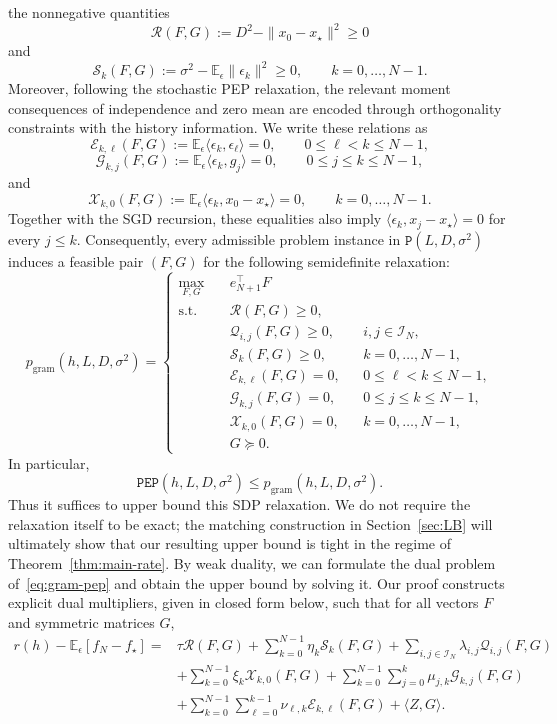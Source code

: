 \documentclass[11pt, hidelinks]{article}
\begin{document}
the nonnegative quantities \[ \mathcal R(F,G) := D^2- \|x_0-x_\star\|^2 \geq0 \] and \[ \mathcal S_k(F,G) := \sigma^2- \mathbb{E}_{\epsilon}\|\epsilon_k\|^2 \geq0, \qquad k=0,\ldots,N-1. \]
Moreover, following the stochastic PEP relaxation, the relevant moment consequences of independence and zero mean are encoded through orthogonality constraints with the history information. We write these relations as
\[ \mathcal E_{k,\ell}(F,G) :=\mathbb{E}_{\epsilon} \langle\epsilon_k,\epsilon_\ell\rangle =0, \qquad 0\leq\ell<k\leq N-1, \]
\[ \mathcal G_{k,j}(F,G) :=\mathbb{E}_{\epsilon} \langle\epsilon_k,g_j\rangle =0, \qquad 0\leq j\leq k\leq N-1, \]
and \[ \mathcal X_{k,0}(F,G) :=\mathbb{E}_{\epsilon} \langle\epsilon_k,x_0-x_\star\rangle =0, \qquad k=0,\ldots,N-1. \]
Together with the SGD recursion, these equalities also imply
$\langle\epsilon_k,x_j-x_\star\rangle=0$
for every $j\leq k$.
Consequently, every admissible problem instance in
$\mathtt P(L,D,\sigma^2)$ induces a feasible pair $(F,G)$ for the
following semidefinite relaxation:
\begin{equation}
\label{eq:gram-pep}
p_{\mathrm{gram}}(h,L,D,\sigma^2) =
\left\{ \begin{aligned}
\max_{F,G}\quad
    &e_{N+1}^\top F
\\
\mathrm{s.t.}\quad
    &\mathcal R(F,G)\geq0,
\\
    &\mathcal Q_{i,j}(F,G)\geq0,
        && i,j\in\mathcal I_N,
\\
    &\mathcal S_k(F,G)\geq0,
        && k=0,\ldots,N-1,
\\
    &\mathcal E_{k,\ell}(F,G)=0,
        &&0\leq\ell<k\leq N-1,
\\
    &\mathcal G_{k,j}(F,G)=0,
        &&0\leq j\leq k\leq N-1,
\\
    &\mathcal X_{k,0}(F,G)=0,
        &&k=0,\ldots,N-1,
\\
    &G\succeq0.
\end{aligned} \right.
\end{equation}
In particular, \[ \mathtt{PEP}(h,L,D,\sigma^2) \leq p_{\mathrm{gram}}(h,L,D,\sigma^2).\]
Thus it suffices to upper bound this SDP relaxation. We do not require
the relaxation itself to be exact; the matching construction in
Section~\ref{sec:LB} will ultimately show that our resulting upper bound
is tight in the regime of Theorem~\ref{thm:main-rate}.
By weak duality, we can formulate the dual problem of~\eqref{eq:gram-pep} and obtain the upper bound by solving it.
Our proof constructs explicit dual multipliers, given in closed form below, such that for all vectors $F$ and symmetric matrices $G$, \begin{equation}\label{eq:certificate-identity}
\begin{aligned}
r(h)-\mathbb{E}_{\epsilon}[f_N-f_\star] = & \tau \mathcal{R}(F,G) +\sum_{k=0}^{N-1}\eta_k \mathcal{S}_k(F,G) +\sum_{i,j\in\mathcal{I}_N}\lambda_{i,j}\mathcal{Q}_{i,j}(F,G) \\
&+ \sum_{k=0}^{N-1}\xi_k\mathcal{X}_{k,0}(F,G) +
\sum_{k=0}^{N-1}\sum_{j=0}^{k} \mu_{j,k}\mathcal{G}_{k,j}(F,G) \\
&+ \sum_{k=0}^{N-1}\sum_{\ell=0}^{k-1} \nu_{\ell,k}\mathcal{E}_{k,\ell}(F,G)
+ \langle Z,G\rangle .
\end{aligned}
\tag{3.1}
\end{equation}
\end{document}
